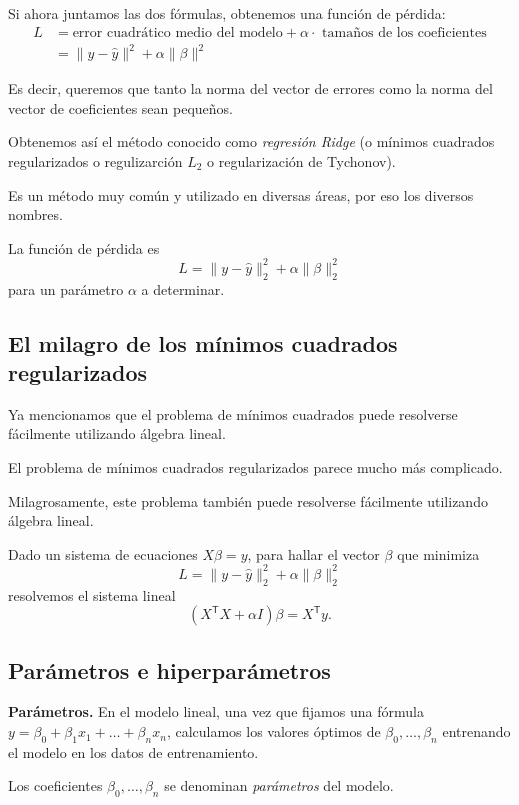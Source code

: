 \documentclass[a4paper]{article}
\begin{document}
Si ahora juntamos las dos fórmulas, obtenemos una función de pérdida:
\begin{align*}
L &= \text{error cuadrático medio del modelo} + \alpha \cdot \text{ tamaños de los coeficientes} \\
&= \|y - \hat y\|^2 + \alpha \|\beta\|^2
\end{align*}

Es decir, queremos que tanto la norma del vector de errores como la norma del vector de coeficientes sean pequeños.

Obtenemos así el método conocido como \emph{regresión Ridge} (o mínimos cuadrados regularizados o regulizarción $L_2$ o regularización de Tychonov).

Es un método muy común y utilizado en diversas áreas, por eso los diversos nombres.

La función de pérdida es
$$
L = \|y - \hat y\|_2^2 + \alpha \|\beta\|_2^2
$$
para un parámetro $\alpha$ a determinar.

\subsection{El milagro de los mínimos cuadrados regularizados}

Ya mencionamos que el problema de mínimos cuadrados puede resolverse fácilmente utilizando álgebra lineal.

El problema de mínimos cuadrados regularizados parece mucho más complicado.

Milagrosamente, este problema también puede resolverse fácilmente  utilizando álgebra lineal.

Dado un sistema de ecuaciones $X \beta = y$, para hallar el vector $\beta$ que minimiza
$$L = \|y - \hat y\|_2^2 + \alpha \|\beta\|_2^2$$
resolvemos el sistema lineal
$$
\left(X^{\mathsf {T}}X+ \alpha I\right) \beta = X^{\mathsf {T}}{y}.
$$

\subsection{Parámetros e hiperparámetros}

\textbf{Parámetros.} En el modelo lineal, una vez que fijamos una fórmula $y = \beta_0 + \beta_1 x_1 + \dots + \beta_n x_n$, calculamos los valores óptimos de $\beta_0, \dots, \beta_n$ entrenando el modelo en los datos de entrenamiento.

Los coeficientes $\beta_0, \dots, \beta_n$ se denominan \emph{parámetros} del modelo.
\end{document}
